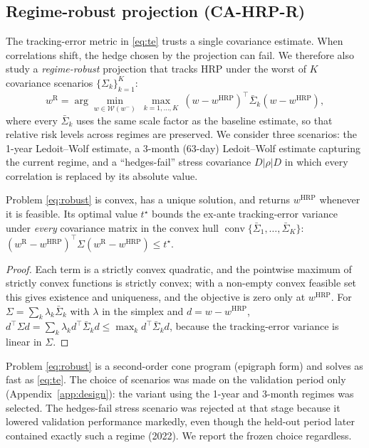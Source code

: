 \subsection{Regime-robust projection (CA-HRP-R)}\label{sec:robust}
The tracking-error metric in \eqref{eq:te} trusts a single covariance estimate. When
correlations shift, the hedge chosen by the projection can fail. We therefore also study a
\emph{regime-robust} projection that tracks HRP under the worst of $K$ covariance
scenarios $\{\Sigma_k\}_{k=1}^K$:
\begin{equation}\label{eq:robust}
w^{\mathrm{R}}=\arg\min_{w\in\mathcal{W}(w^-)}\ \max_{k=1,\dots,K}\
(w-w^{\mathrm{HRP}})^\top\bar\Sigma_k(w-w^{\mathrm{HRP}}),
\end{equation}
where every $\bar\Sigma_k$ uses the same scale factor as the baseline estimate, so that
relative risk levels across regimes are preserved. We consider three scenarios: the
1-year Ledoit--Wolf estimate, a 3-month (63-day) Ledoit--Wolf estimate capturing the
current regime, and a ``hedges-fail'' stress covariance
$D\lvert\rho\rvert D$ in which every correlation is replaced by its absolute value.

\begin{proposition}\label{prop:robust}
Problem \eqref{eq:robust} is convex, has a unique solution, and returns $w^{\mathrm{HRP}}$
whenever it is feasible. Its optimal value $t^\star$ bounds the ex-ante tracking-error
variance under \emph{every} covariance matrix in the convex hull
$\operatorname{conv}\{\bar\Sigma_1,\dots,\bar\Sigma_K\}$:
$(w^{\mathrm{R}}-w^{\mathrm{HRP}})^\top\Sigma(w^{\mathrm{R}}-w^{\mathrm{HRP}})\le t^\star$.
\end{proposition}
\begin{proof}
Each term is a strictly convex quadratic, and the pointwise maximum of strictly convex
functions is strictly convex; with a non-empty convex feasible set this gives existence
and uniqueness, and the objective is zero only at $w^{\mathrm{HRP}}$. For
$\Sigma=\sum_k\lambda_k\bar\Sigma_k$ with $\lambda$ in the simplex and $d=w-w^{\mathrm{HRP}}$,
$d^\top\Sigma d=\sum_k\lambda_k d^\top\bar\Sigma_k d\le\max_k d^\top\bar\Sigma_k d$, because
the tracking-error variance is linear in $\Sigma$.
\end{proof}

Problem \eqref{eq:robust} is a second-order cone program (epigraph form) and solves as fast
as \eqref{eq:te}. The choice of scenarios was made on the validation period only
(Appendix~\ref{app:design}): the variant using the 1-year and 3-month regimes was selected.
The hedges-fail stress scenario was rejected at that stage because it lowered validation
performance markedly, even though the held-out period later contained exactly such a
regime (2022). We report the frozen choice regardless.
